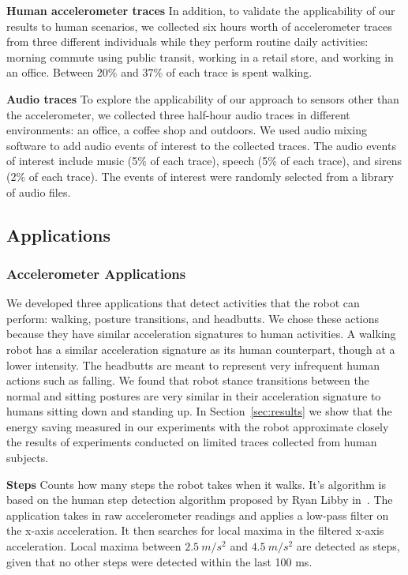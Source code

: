 {\bf Human accelerometer traces}
In addition, to validate the applicability of our results to human
scenarios, we collected six hours worth of accelerometer traces from
three different individuals while they perform routine daily
activities: morning commute using public transit, working in a retail
store, and working in an office.  Between 20\% and 37\% of each trace
is spent walking.

{\bf Audio traces} 
To explore the applicability of our approach to sensors other than 
the accelerometer, we collected three half-hour audio traces in
different environments: an office, a coffee shop and outdoors.  We
used audio mixing software to add audio events of interest to the
collected traces.  The audio events of interest include music (5\%
of each trace), speech (5\% of each trace), and sirens (2\% of each 
trace).  The events of interest were randomly selected from a library
of audio files.

\subsection{Applications}

\subsubsection{Accelerometer Applications}

We developed three applications that detect activities that the robot
can perform: walking, posture transitions, and headbutts.  
We chose these
actions because they have similar acceleration signatures to human
activities.  A walking robot has a similar acceleration signature as
its human counterpart, though at a lower intensity.  The headbutts are
meant to represent very infrequent human actions such as falling.  We
found that robot stance transitions between the normal and sitting
postures are very similar in their acceleration signature to humans
sitting down and standing up.  In Section~\ref{sec:results} we show
that the energy saving measured in our experiments with the robot
approximate closely the results of experiments conducted on limited
traces collected from human subjects.

{\bf Steps} Counts how many steps the robot takes when it
  walks. It's algorithm is based on the human step detection algorithm
  proposed by Ryan Libby in~\cite{libbyFootstepDetection}. The
  application takes in raw accelerometer readings and applies a
  low-pass filter on the x-axis acceleration. It then searches for
  local maxima in the filtered x-axis acceleration. Local maxima
  between $2.5\:m/s^2$ and $4.5\:m/s^2$ are detected as steps, given
  that no other steps were detected within the last 100 ms.

